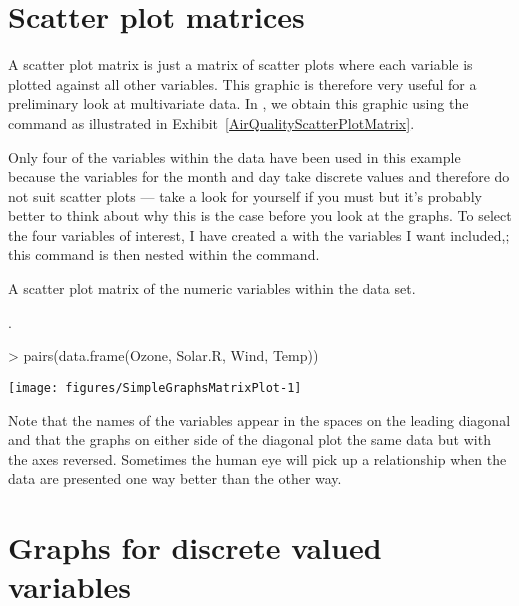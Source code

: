 \section{Scatter plot matrices} 
\label{ScatterPlotMatrices} 
 
A scatter plot matrix is just a matrix of scatter plots where each variable is plotted against all other variables. This graphic is therefore very useful for a preliminary look at multivariate data. In \R{}, we obtain this graphic using the  command as illustrated in Exhibit~\ref{AirQualityScatterPlotMatrix}. 
 
Only four of the variables within the  data have been used in this example because the variables for the month and day take discrete values and therefore do not suit scatter plots --- take a look for yourself if you must but it's probably better to think about why this is the case before you look at the graphs. To select the four variables of interest, I have created a  with the variables I want included,; this  command is then nested within the  command. 
\begin{exhibit} 
\begin{center} 
\caption{A scatter plot matrix of the numeric variables within the  data set.} 
\label{AirQualityScatterPlotMatrix}. 

\begin{Schunk}
\begin{Sinput}
> pairs(data.frame(Ozone, Solar.R, Wind, Temp)) 
\end{Sinput}

\texttt{[image: figures/SimpleGraphsMatrixPlot-1]} \end{Schunk}

\end{center} 
\end{exhibit} 
 
Note that the names of the variables appear in the spaces on the leading diagonal and that the graphs on either side of the diagonal plot the same data but with the axes reversed. Sometimes the human eye will pick up a relationship when the data are presented one way better than the other way. 
 
\section{Graphs for discrete valued variables} 
 
